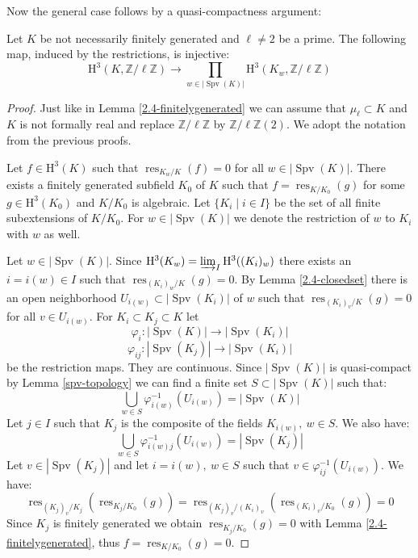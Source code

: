 Now the general case follows by a quasi-compactness argument:

\begin{lemma}\label{2.4}
Let $K$ be not necessarily finitely generated and $\ell\neq 2$ be a prime. The following map, induced by the restrictions, is injective:
\[ \mathrm{H}^3(K,\mathbb{Z}/\ell\mathbb{Z})\longrightarrow \prod_{w\in |\operatorname{Spv}(K)| }\mathrm{H}^3(K_w,\mathbb{Z}/\ell\mathbb{Z}) \]
\end{lemma}

\begin{proof}
Just like in Lemma \ref{2.4-finitelygenerated} we can assume that $\mu_\ell\subset K$ and $K$ is not formally real and replace $\mathbb{Z}/\ell\mathbb{Z}$ by $\mathbb{Z}/\ell\mathbb{Z}(2)$. We adopt the notation from the previous proofs.

Let $f\in\mathrm{H}^3(K)$ such that $\operatorname{res}_{K_w/K}(f) = 0$ for all $w\in |\operatorname{Spv}(K)|$. There exists a finitely generated subfield $K_0$ of $K$ such that $f = \operatorname{res}_{K/K_0}(g)$ for some $g\in\mathrm{H}^3(K_0)$ and $K/K_0$ is algebraic. Let $\{K_i\mid i\in I\}$ be the set of all finite subextensions of $K/K_0$. For $w\in |\operatorname{Spv}(K)|$ we denote the restriction of $w$ to $K_i$ with $w$ as well.

Let  $w\in |\operatorname{Spv}(K)|$. Since $\mathrm{H}^3(K_w) = \varinjlim_I \mathrm{H}^3((K_i)_w)$ there exists an $i = i(w)\in I$ such that $\operatorname{res}_{(K_i)_w/K}(g) = 0$. By Lemma \ref{2.4-closedset} there is an open neighborhood $U_{i(w)}\subset |\operatorname{Spv}(K_i)|$ of $w$ such that $\operatorname{res}_{(K_i)_v/K}(g)=0$ for all $v\in U_{i(w)}$. For $K_i\subset K_j\subset K$ let
\[ \varphi_i: |\operatorname{Spv}(K)| \to |\operatorname{Spv}(K_i)| \]
\[ \varphi_{ij}: |\operatorname{Spv}(K_j)|\to |\operatorname{Spv}(K_i)| \]
be the restriction maps. They are continuous. Since $|\operatorname{Spv}(K)|$ is quasi-compact by Lemma \ref{spv-topology} we can find a finite set $S\subset |\operatorname{Spv}(K)|$ such that:
\[ \bigcup_{w\in S}\varphi^{-1}_{i(w)}(U_{i(w)}) = |\operatorname{Spv}(K)| \]
Let $j\in I$ such that $K_j$ is the composite of the fields $K_{i(w)},\ w\in S$. We also have:
\[ \bigcup_{w\in S}\varphi^{-1}_{i(w)j}(U_{i(w)}) = |\operatorname{Spv}(K_j)| \]
Let $v\in |\operatorname{Spv}(K_j)|$ and let $i = i(w),\ w\in S$ such that $v\in\varphi_{ij}^{-1}(U_{i(w)})$. We have:
\[ \operatorname{res}_{(K_j)_v/K_j}(\operatorname{res}_{K_j/K_0}(g)) = \operatorname{res}_{(K_j)_v/(K_i)_v}(\operatorname{res}_{(K_i)_v/K_0}(g)) = 0 \]
Since $K_j$ is finitely generated we obtain $\operatorname{res}_{K_j/K_0}(g) = 0$ with Lemma \ref{2.4-finitelygenerated}, thus $f = \operatorname{res}_{K/K_0}(g) = 0$.
\end{proof}

